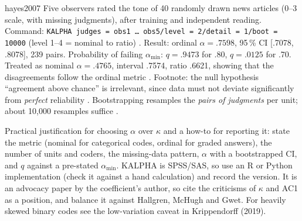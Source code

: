 \begin{papercard}{hayes2007}
 Five observers rated the tone of 40 randomly drawn news articles (0--3 scale, with missing judgments), after training and independent reading. Command: \texttt{KALPHA judges = obs1 \ldots\ obs5/level = 2/detail = 1/boot = 10000} (level 1--4 = nominal to ratio) . Result: ordinal $\alpha=.7598$, 95\,\% CI [.7078, .8078], 239 pairs. Probability of failing $\alpha_{\min}$: $q=.9473$ for .80, $q=.0125$ for .70. Treated as nominal $\alpha=.4765$, interval .7574, ratio .6621, showing that the disagreements follow the ordinal metric . Footnote: the null hypothesis ``agreement above chance'' is irrelevant, since data must not deviate significantly from \emph{perfect} reliability . Bootstrapping resamples the \emph{pairs of judgments} per unit; about 10,000 resamples suffice .

 Practical justification for choosing $\alpha$ over $\kappa$ and a how-to for reporting it: state the metric (nominal for categorical codes, ordinal for graded answers), the number of units and coders, the missing-data pattern, $\alpha$ with a bootstrapped CI, and $q$ against a pre-stated $\alpha_{\min}$. KALPHA is SPSS/SAS, so use an R or Python implementation (check it against a hand calculation) and record the version. It is an advocacy paper by the coefficient's author, so cite the criticisms of $\kappa$ and AC1 as a position, and balance it against Hallgren, McHugh and Gwet. For heavily skewed binary codes see the low-variation caveat in Krippendorff (2019).
\end{papercard}
